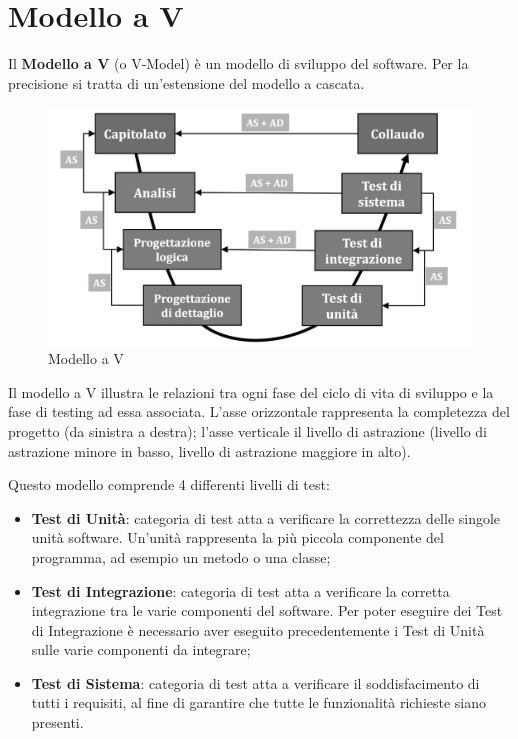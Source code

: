 \section{Modello a V}
\label{modelloV}

Il \textbf{Modello a V} (o V-Model) è un modello di sviluppo del software. Per la precisione si tratta di un'estensione del modello a cascata. 

\begin{figure}[H]
\centering
	\includegraphics[width=0.7\linewidth]{./images/modellov.jpg} 
	\caption{Modello a V}
	\label{vmodel}
\end{figure}

Il modello a V illustra le relazioni tra ogni fase del ciclo di vita di sviluppo e la fase di testing ad essa associata. L'asse orizzontale rappresenta la completezza del progetto (da sinistra a destra); l'asse verticale il livello di astrazione (livello di astrazione minore in basso, livello di astrazione maggiore in alto).

Questo modello comprende 4 differenti livelli di test: 
\begin{itemize}
	\item \textbf{Test di Unità}: categoria di test atta a verificare la correttezza delle singole unità software. Un'unità rappresenta la più piccola componente del programma, ad esempio un metodo o una classe;
	\item \textbf{Test di Integrazione}: categoria di test atta a verificare la corretta integrazione tra le varie componenti del software. Per poter eseguire dei Test di Integrazione è necessario aver eseguito precedentemente i Test di Unità sulle varie componenti da integrare;
	\item \textbf{Test di Sistema}: categoria di test atta a verificare il soddisfacimento di tutti i requisiti, al fine di garantire che tutte le funzionalità richieste siano presenti.
\end{itemize}

